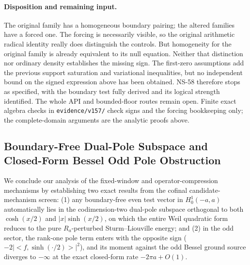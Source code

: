 \documentclass[11pt]{article}
\def\ip#1#2{<#1,#2>}%
\theoremstyle{remark}
\newcommand{\ip}[2]{\left\langle #1,#2\right\rangle}
\begin{document}
\paragraph{Disposition and remaining input.}
The original family has a homogeneous boundary pairing; the altered
families have a forced one. The forcing is necessarily visible, so
the original arithmetic radical identity really does distinguish the
controls. But homogeneity for the original family is already equivalent
to its null equation. Neither that distinction nor ordinary density
establishes the missing sign. The first-zero assumptions add the
previous support saturation and variational inequalities, but no
independent bound on the signed expression above has been obtained.
NS-58 therefore stops as specified, with the boundary test fully
derived and its logical strength identified. The whole API and
bounded-floor routes remain open. Finite exact algebra checks in
\texttt{evidence/v157/} check signs and the forcing bookkeeping only;
the complete-domain arguments are the analytic proofs above.




\subsection{Boundary-Free Dual-Pole Subspace and Closed-Form Bessel Odd Pole Obstruction}\label{subsec:dual-pole-bessel}

We conclude our analysis of the fixed-window and operator-compression mechanisms by establishing two exact results from the cofinal candidate-mechanism screen: (1) any boundary-free even test vector in $H_0^1(-a,a)$ automatically lies in the codimension-two dual-pole subspace orthogonal to both $\cosh(x/2)$ and $|x|\sinh(x/2)$, on which the entire Weil quadratic form reduces to the pure $R_a$-perturbed Sturm--Liouville energy; and (2) in the odd sector, the rank-one pole term enters with the opposite sign ($-2|\ip{f}{\sinh(\cdot/2)}|^2$), and its moment against the odd Bessel ground source diverges to $-\infty$ at the exact closed-form rate $-2\pi a + O(1)$.
\end{document}
